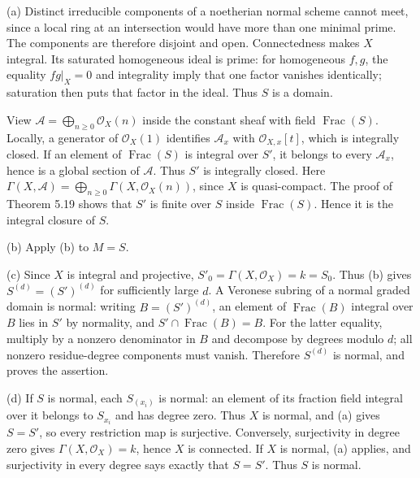 (a) Distinct irreducible components of a noetherian normal scheme cannot meet, since a local ring at an intersection would have more than one minimal prime. The components are therefore disjoint and open. Connectedness makes $X$ integral. Its saturated homogeneous ideal is prime: for homogeneous $f,g$, the equality $fg|_X=0$ and integrality imply that one factor vanishes identically; saturation then puts that factor in the ideal. Thus $S$ is a domain.

View $\mathcal A=\bigoplus_{n\ge0}\mathcal O_X(n)$ inside the constant sheaf with field $\operatorname{Frac}(S)$. Locally, a generator of $\mathcal O_X(1)$ identifies $\mathcal A_x$ with $\mathcal O_{X,x}[t]$, which is integrally closed. If an element of $\operatorname{Frac}(S)$ is integral over $S'$, it belongs to every $\mathcal A_x$, hence is a global section of $\mathcal A$. Thus $S'$ is integrally closed. Here $\Gamma(X,\mathcal A)=\bigoplus_{n\ge0}\Gamma(X,\mathcal O_X(n))$, since $X$ is quasi-compact. The proof of Theorem 5.19 shows that $S'$ is finite over $S$ inside $\operatorname{Frac}(S)$. Hence it is the integral closure of $S$.

(b) Apply (b) to $M=S$.

(c) Since $X$ is integral and projective, $S'_0=\Gamma(X,\mathcal O_X)=k=S_0$. Thus (b) gives $S^{(d)}=(S')^{(d)}$ for sufficiently large $d$. A Veronese subring of a normal graded domain is normal: writing $B=(S')^{(d)}$, an element of $\operatorname{Frac}(B)$ integral over $B$ lies in $S'$ by normality, and $S'\cap\operatorname{Frac}(B)=B$. For the latter equality, multiply by a nonzero denominator in $B$ and decompose by degrees modulo $d$; all nonzero residue-degree components must vanish. Therefore $S^{(d)}$ is normal, and  proves the assertion.

(d) If $S$ is normal, each $S_{(x_i)}$ is normal: an element of its fraction field integral over it belongs to $S_{x_i}$ and has degree zero. Thus $X$ is normal, and (a) gives $S=S'$, so every restriction map is surjective. Conversely, surjectivity in degree zero gives $\Gamma(X,\mathcal O_X)=k$, hence $X$ is connected. If $X$ is normal, (a) applies, and surjectivity in every degree says exactly that $S=S'$. Thus $S$ is normal.
